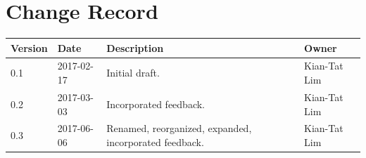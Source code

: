 \documentclass[]{article}
\begin{document}
\section{Change Record}\label{change-record}

\begin{longtable}[]{@{}llll@{}}
\toprule
\begin{minipage}[b]{0.16\columnwidth}\raggedright\strut
\textbf{Version}\strut
\end{minipage} & \begin{minipage}[b]{0.15\columnwidth}\raggedright\strut
\textbf{Date}\strut
\end{minipage} & \begin{minipage}[b]{0.39\columnwidth}\raggedright\strut
\textbf{Description}\strut
\end{minipage} & \begin{minipage}[b]{0.19\columnwidth}\raggedright\strut
\textbf{Owner}\strut
\end{minipage}\tabularnewline
\midrule
\endhead
\begin{minipage}[t]{0.16\columnwidth}\raggedright\strut
0.1\strut
\end{minipage} & \begin{minipage}[t]{0.15\columnwidth}\raggedright\strut
2017-02-17\strut
\end{minipage} & \begin{minipage}[t]{0.39\columnwidth}\raggedright\strut
Initial draft.\strut
\end{minipage} & \begin{minipage}[t]{0.19\columnwidth}\raggedright\strut
Kian-Tat Lim\strut
\end{minipage}\tabularnewline
\begin{minipage}[t]{0.16\columnwidth}\raggedright\strut
0.2\strut
\end{minipage} & \begin{minipage}[t]{0.15\columnwidth}\raggedright\strut
2017-03-03\strut
\end{minipage} & \begin{minipage}[t]{0.39\columnwidth}\raggedright\strut
Incorporated feedback.\strut
\end{minipage} & \begin{minipage}[t]{0.19\columnwidth}\raggedright\strut
Kian-Tat Lim\strut
\end{minipage}\tabularnewline
\begin{minipage}[t]{0.16\columnwidth}\raggedright\strut
0.3\strut
\end{minipage} & \begin{minipage}[t]{0.15\columnwidth}\raggedright\strut
2017-06-06\strut
\end{minipage} & \begin{minipage}[t]{0.39\columnwidth}\raggedright\strut
Renamed, reorganized, expanded, incorporated feedback.\strut
\end{minipage} & \begin{minipage}[t]{0.19\columnwidth}\raggedright\strut
Kian-Tat Lim\strut
\end{minipage}\tabularnewline
\bottomrule
\end{longtable}
\end{document}
